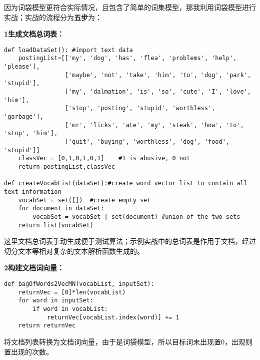 因为词袋模型更符合实际情况，且包含了简单的词集模型，那我利用词袋模型进行实战；实战的流程分为\textbf{五步}为：

\noindent\textbf{\textcircled{\footnotesize{1}}生成文档总词表： }
\begin{lstlisting}
def loadDataSet(): #import text data
    postingList=[['my', 'dog', 'has', 'flea', 'problems', 'help', 'please'],
                 ['maybe', 'not', 'take', 'him', 'to', 'dog', 'park', 'stupid'],
                 ['my', 'dalmation', 'is', 'so', 'cute', 'I', 'love', 'him'],
                 ['stop', 'posting', 'stupid', 'worthless', 'garbage'],
                 ['mr', 'licks', 'ate', 'my', 'steak', 'how', 'to', 'stop', 'him'],
                 ['quit', 'buying', 'worthless', 'dog', 'food', 'stupid']]
    classVec = [0,1,0,1,0,1]    #1 is abusive, 0 not
    return postingList,classVec

def createVocabList(dataSet):#create word vector list to contain all text information
    vocabSet = set([])  #create empty set
    for document in dataSet:
        vocabSet = vocabSet | set(document) #union of the two sets
    return list(vocabSet)
\end{lstlisting}

这里文档总词表手动生成便于测试算法；示例实战中的总词表是作用于文档，经过切分文本等相对复杂的文本解析函数生成的。

\noindent\textbf{\textcircled{\footnotesize{2}}构建文档词向量：}
\begin{lstlisting}
def bagOfWords2VecMN(vocabList, inputSet):
    returnVec = [0]*len(vocabList)
    for word in inputSet:
        if word in vocabList:
            returnVec[vocabList.index(word)] += 1
    return returnVec
\end{lstlisting}

将文档列表转换为文档词向量，由于是词袋模型，所以目标词未出现置0，出现则置出现的次数。

